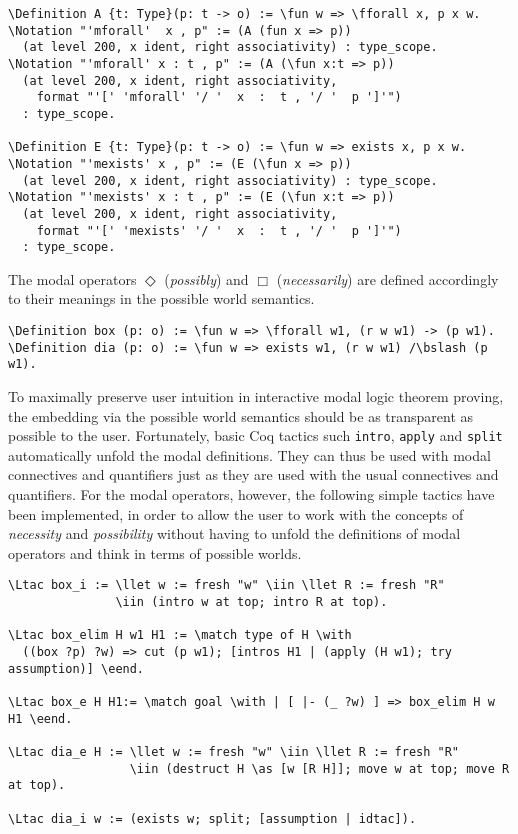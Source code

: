 \documentclass{llncs}
\newcommand{\red}[1]{\textcolor[rgb]{1,0,0}{#1}}
\newcommand{\blue}[1]{\textcolor[rgb]{0,0,1}{#1}}
\newcommand{\Ltac}{\red{Ltac}}
\newcommand{\Definition}{\red{Definition}}
\newcommand{\Notation}{\blue{Notation}}
\newcommand{\llet}{\blue{let}}
\newcommand{\match}{\blue{match}}
\newcommand{\with}{\blue{with}}
\newcommand{\eend}{\blue{end}}
\newcommand{\iin}{\blue{in}}
\newcommand{\as}{\blue{as}}
\newcommand{\fforall}{\blue{forall}}
\newcommand{\fun}{\blue{fun}}
\newcommand{\bslash}{\symbol{92}}
\begin{document}
\begin{Verbatim}[commandchars=\\\{\},fontsize=\verbsize]
\Definition A {t: Type}(p: t -> o) := \fun w => \fforall x, p x w.
\Notation "'mforall'  x , p" := (A (fun x => p))
  (at level 200, x ident, right associativity) : type_scope.
\Notation "'mforall' x : t , p" := (A (\fun x:t => p))
  (at level 200, x ident, right associativity, 
    format "'[' 'mforall' '/ '  x  :  t , '/ '  p ']'")
  : type_scope.

\Definition E {t: Type}(p: t -> o) := \fun w => exists x, p x w.
\Notation "'mexists' x , p" := (E (\fun x => p))
  (at level 200, x ident, right associativity) : type_scope.
\Notation "'mexists' x : t , p" := (E (\fun x:t => p))
  (at level 200, x ident, right associativity, 
    format "'[' 'mexists' '/ '  x  :  t , '/ '  p ']'")
  : type_scope.
\end{Verbatim}

\noindent
The modal operators $\Diamond$ (\emph{possibly}) and $\Box$ (\emph{necessarily}) are defined accordingly to their meanings in the possible world semantics.

\begin{Verbatim}[commandchars=\\\{\},fontsize=\verbsize]
\Definition box (p: o) := \fun w => \fforall w1, (r w w1) -> (p w1).
\Definition dia (p: o) := \fun w => exists w1, (r w w1) /\bslash (p w1).
\end{Verbatim}

\noindent
To maximally preserve user intuition in interactive modal logic theorem
proving, the embedding via the possible world semantics should be as
transparent as possible to the user. Fortunately, basic Coq tactics
such \texttt{intro}, \texttt{apply} and \texttt{split} automatically
unfold the modal definitions. They can thus be used with modal
connectives and quantifiers just as they are used with the usual
connectives and quantifiers.  For the modal operators, however, the
following simple tactics have been implemented, in order to allow the
user to work with the concepts of \emph{necessity} and
\emph{possibility} without having to unfold the definitions of modal
operators and think in terms of possible worlds.

\begin{Verbatim}[commandchars=\\\{\},fontsize=\verbsize]
\Ltac box_i := \llet w := fresh "w" \iin \llet R := fresh "R" 
               \iin (intro w at top; intro R at top).

\Ltac box_elim H w1 H1 := \match type of H \with 
  ((box ?p) ?w) => cut (p w1); [intros H1 | (apply (H w1); try assumption)] \eend.

\Ltac box_e H H1:= \match goal \with | [ |- (_ ?w) ] => box_elim H w H1 \eend.

\Ltac dia_e H := \llet w := fresh "w" \iin \llet R := fresh "R" 
                 \iin (destruct H \as [w [R H]]; move w at top; move R at top).

\Ltac dia_i w := (exists w; split; [assumption | idtac]).
\end{Verbatim}
\end{document}
